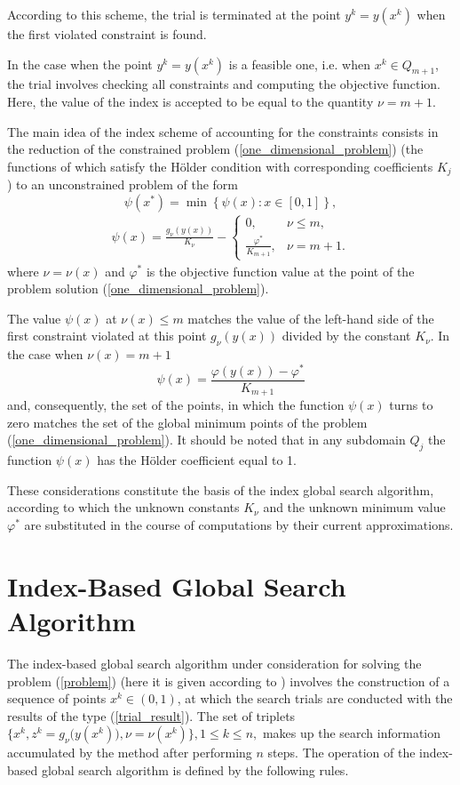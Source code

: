 \documentclass[preprint]{elsarticle}
\begin{document}
	According to this scheme, the trial is terminated at the point $y^k=y(x^k)$ when the first violated constraint  is found.
	
	In the case when the point $y^k = y(x^k)$ is a feasible one, i.e. when $x^k \in Q_{m+1}$, the trial involves checking all constraints and computing the objective function. Here, the value of the index is accepted to be equal to the quantity $\nu = m+1$.
	
	The main idea of the index scheme of accounting for the constraints consists in the reduction of the constrained problem (\ref{one_dimensional_problem}) (the functions of which satisfy the H\"{o}lder condition with corresponding coefficients $K_j$) to an unconstrained problem of the form
\begin{equation}\label{reduction_problem}
	\psi(x^*)=\min \left\{\psi(x): x \in [0,1] \right\},
\end{equation}
\begin{eqnarray} \nonumber
	\psi(x)=\frac{g_{\nu}(y(x))}{K_{\nu}} - 
	\left\{
   \begin{array}{lr}
     0, & \nu \leq m,\\
     \frac{\varphi^\ast}{K_{m+1}}, & \nu = m + 1.
   \end{array}
	\right.
\end{eqnarray}
where $\nu = \nu(x)$ and $\varphi^\ast$ is the objective function value at the point of the problem solution (\ref{one_dimensional_problem}).

	The value $\psi(x)$ at $\nu(x) \leq m$ matches the value of the left-hand side of the first constraint violated at this point $g_{\nu}(y(x))$ divided by the constant $K_{\nu}$. In the case when $\nu(x) = m+1$ 
$$
	\psi(x)=\frac{\varphi(y(x))-\varphi^\ast}{K_{m+1}}
$$
and, consequently, the set of the points, in which the function $\psi(x)$ turns to zero matches the set of the global minimum points of the problem (\ref{one_dimensional_problem}). It should be noted that in any subdomain $Q_j$ the function $\psi(x)$ has the H\"{o}lder coefficient equal to 1.
	
	These considerations constitute the basis of the index global search algorithm, according to which the unknown constants $K_{\nu}$ and the unknown minimum value $\varphi^\ast$ are substituted in the course of computations by their current approximations.



\section{Index-Based Global Search Algorithm}
	The index-based global search algorithm under consideration for solving the problem (\ref{problem}) (here it is given according to \cite{Strongin2000}) involves the construction of a sequence of points $x^k \in (0,1)$, at which the search trials are conducted with the results of the type (\ref{trial_result}). The set of triplets $\{x^k, z^k=g_{\nu}\big(y(x^k)\big), \nu=\nu(x^k)\}, 1 \leq k \leq n,$  makes up the search information accumulated by the method after performing $n$ steps. The operation of the index-based global search algorithm is defined by the following rules.
	
\end{document}
